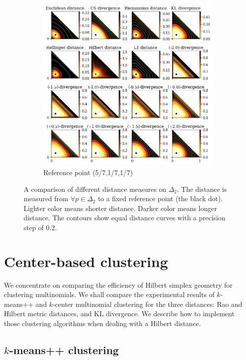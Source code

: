 \documentclass[graybox]{svmult}
\begin{document}
\begin{figure}\ContinuedFloat
\centering
\begin{subfigure}{\textwidth}
\includegraphics[width=\textwidth]{categories2}
\caption{Reference point (5/7,1/7,1/7)}
\end{subfigure}
\caption{A comparison of different distance measures on $\Delta_2$. The distance is measured from
$\forall{p}\in\Delta_2$ to a fixed reference point (the black dot). Lighter color means shorter
distance. Darker color means longer distance. The contours show equal distance curves with a precision step of $0.2$.\label{vis:distance}}
\end{figure}


\section{Center-based clustering}\label{sec:clustering}

We concentrate on comparing the efficiency of Hilbert simplex geometry for clustering multinomials.
We shall compare the experimental results of $k$-means++ and $k$-center multinomial clustering for
the three distances: Rao and Hilbert metric distances, and KL divergence.
We describe how to implement those clustering algorithms when dealing with a Hilbert distance.

\subsection{$k$-means++ clustering}
\end{document}
